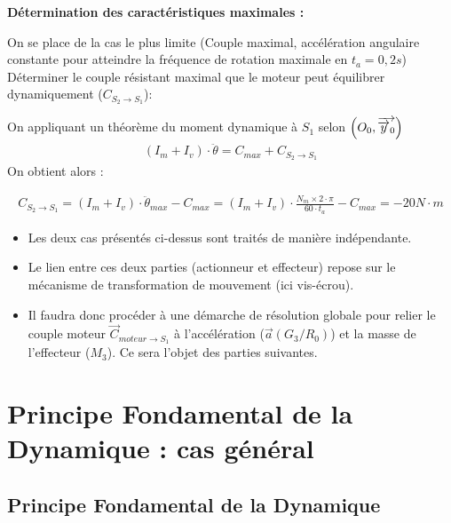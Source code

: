 \documentclass[10pt,fleqn]{article} %
\begin{document}
\begin{exemple}
\textbf{Détermination des caractéristiques maximales : }

On se place de la cas le plus limite (Couple maximal, accélération angulaire constante pour atteindre la fréquence de rotation maximale en $t_a=0,2s$)
Déterminer le couple résistant maximal que le moteur peut équilibrer dynamiquement ($C_{S_2\to S_1}$):

On appliquant un théorème du moment dynamique à $S_1$ selon $\left(O_0,\overrightarrow{\overrightarrow{y}_0}\right)$
\begin{align*}
(I_m+I_v)\cdot \ddot{\theta}=C_{max}+C_{S_2\to S_1}
\end{align*}
On obtient alors : 

\begin{align*}
C_{S_2\to S_1}=(I_m+I_v)\cdot \ddot{\theta}_{max}-C_{max}=(I_m+I_v)\cdot \frac{N_m\times 2\cdot \pi}{60\cdot t_a}-C_{max}=-20N\cdot m
\end{align*}

\end{exemple}

\begin{itemize}
\item Les deux cas présentés ci-dessus sont traités de manière indépendante.
\item Le lien entre ces deux parties (actionneur et effecteur) repose sur le mécanisme de transformation de mouvement (ici vis-écrou).
\item Il faudra donc procéder à une démarche de résolution globale pour relier le couple moteur $\overrightarrow{C}_{moteur\to S_1}$ à l'accélération ($\overrightarrow{a}(G_3/R_0)$) et la masse de l'effecteur ($M_3$). Ce sera l'objet des parties suivantes.
\end{itemize}


\section{Principe Fondamental de la Dynamique : cas général}

\subsection{Principe Fondamental de la Dynamique}
\end{document}
